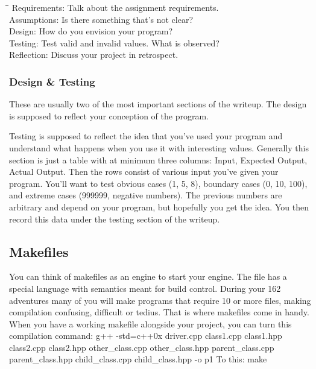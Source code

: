 \documentclass[letterpaper,10pt,titlepage,fleqn]{article}
\begin{document}
\begin{tabbing}
\hspace*{2cm}\=\hspace*{3cm}\= \kill
Requirements: 	\>\>Talk about the assignment requirements. \\
Assumptions: 	\>\>Is there something that’s not clear? \\
Design: 		\>\>How do you envision your program? \\
Testing:		\>\>Test valid and invalid values. What is observed? \\
Reflection: 	\>\>Discuss your project in retrospect. \\
\end{tabbing}


\subsubsection{Design \& Testing}
These are usually two of the most important sections of the writeup. The design
is supposed to reflect your conception of the program.

Testing is supposed to reflect the idea that you've used your program and
understand what happens when you use it with interesting values. Generally this
section is just a table with at minimum three columns: Input, Expected Output,
Actual Output. Then the rows consist of various input you've given your program.
You'll want to test obvious cases (1, 5, 8), boundary cases (0, 10, 100), and
extreme cases (999999, negative numbers). The previous numbers are arbitrary and
depend on your program, but hopefully you get the idea. You then record this
data under the testing section of the writeup.


\subsection{Makefiles}
You can think of makefiles as an engine to start your engine. The
file has a special language with semantics meant for build control. During your
162 adventures many of you will make programs that require 10 or more files,
making compilation confusing, difficult or tedius. That is where makefiles come
in handy. When you have a working makefile alongside your project, you can turn
this compilation command:
\newline
\newline
g++ -std=c++0x driver.cpp class1.cpp class1.hpp class2.cpp class2.hpp
other\_class.cpp other\_class.hpp parent\_class.cpp parent\_class.hpp
child\_class.cpp child\_class.hpp -o p1
\newline
\newline
To this:
\newline
\newline
make
\newline
\end{document}
